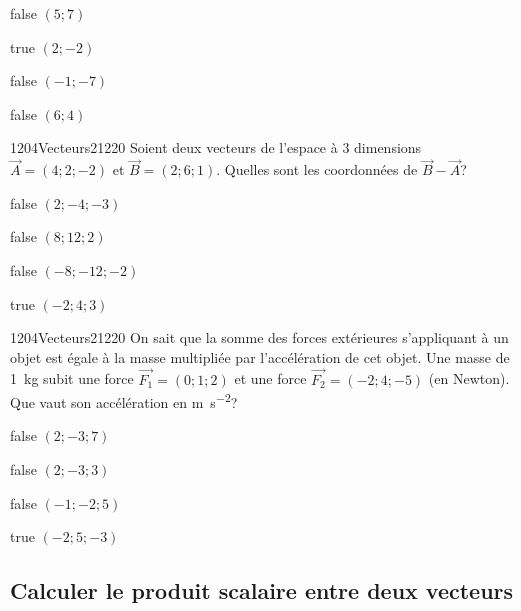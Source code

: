 \documentclass[11pt]{article}
\begin{document}
            \begin{reponses}
                \item[false] $(5;7)$
                \item[true] $(2;-2)$
                \item[false] $(-1;-7)$
                \item[false] $(6;4)$
            \end{reponses}

            \begin{question}{1204}{Vecteurs}{2}{1220}
               Soient deux vecteurs de l'espace à 3 dimensions $\vec{A}=(4;2;-2)$ et $\vec{B}=(2;6;1)$. Quelles sont les coordonnées de $\vec{B}-\vec{A}$?
            \end{question}

            \begin{reponses}
                \item[false] $(2;-4;-3)$
                \item[false] $(8;12;2)$
                \item[false] $(-8;-12;-2)$
                \item[true] $(-2;4;3)$
            \end{reponses}

            \begin{question}{1204}{Vecteurs}{2}{1220}
                On sait que la somme des forces extérieures s'appliquant à un objet est égale à la masse multipliée par l'accélération de cet objet. Une masse de \SI{1}{\kilo\gram} subit une force $\vec{F_1}=(0;1;2)$ et une force $\vec{F_2}=(-2;4;-5)$ (en Newton). Que vaut son accélération en \si{\meter\per\second\squared}?
            \end{question}

            \begin{reponses}
                \item[false] $(2;-3;7)$
                \item[false] $(2;-3;3)$
                \item[false] $(-1;-2;5)$
                \item[true] $(-2;5;-3)$
            \end{reponses}

        \subsection{Calculer le produit scalaire entre deux vecteurs}
        
\end{document}
